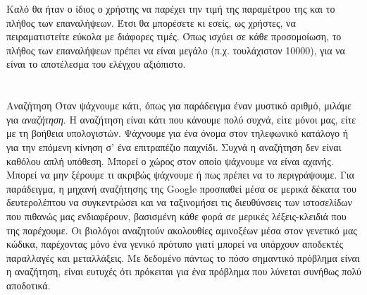 \documentclass[a4paper,11pt,oneside]{book}
\begin{document}
\begin{exercise}
\begin{note} 
Καλό θα ήταν ο ίδιος ο χρήστης να παρέχει την τιμή της παραμέτρου  της  και το πλήθος των επαναλήψεων. 
Έτσι θα μπορέσετε κι εσείς, ως χρήστες, να πειραματιστείτε εύκολα με διάφορες τιμές. Όπως ισχύει σε κάθε προσομοίωση, το πλήθος των επαναλήψεων πρέπει να είναι μεγάλο (π.χ. τουλάχιστον 10000), για να είναι το αποτέλεσμα του ελέγχου αξιόπιστο. 
\end{note}
\end{exercise}



\section*{}
\hrulefill


\begin{theory}{Αναζήτηση}
Όταν ψάχνουμε κάτι, όπως για παράδειγμα έναν μυστικό αριθμό, μιλάμε για \emph{αναζήτηση}. Η αναζήτηση είναι κάτι που κάνουμε πολύ συχνά, είτε μόνοι μας, είτε με τη βοήθεια υπολογιστών. Ψάχνουμε για ένα όνομα στον τηλεφωνικό κατάλογο ή για την επόμενη κίνηση σ' ένα επιτραπέζιο παιχνίδι. Συχνά η αναζήτηση δεν είναι καθόλου απλή υπόθεση. Μπορεί ο χώρος στον οποίο ψάχνουμε να είναι αχανής. Μπορεί να μην ξέρουμε τι ακριβώς ψάχνουμε ή πως πρέπει να το περιγράψουμε. Για παράδειγμα, η μηχανή αναζήτησης της Google προσπαθεί μέσα σε μερικά δέκατα του δευτερολέπτου να συγκεντρώσει και να ταξινομήσει τις διευθύνσεις των ιστοσελίδων που πιθανώς μας ενδιαφέρουν, βασισμένη κάθε φορά σε μερικές λέξεις-κλειδιά που της παρέχουμε. Οι βιολόγοι αναζητούν ακολουθίες αμινοξέων μέσα στον γενετικό μας κώδικα, παρέχοντας μόνο ένα γενικό πρότυπο γιατί μπορεί να υπάρχουν αποδεκτές παραλλαγές και μεταλλάξεις. Με δεδομένο πάντως το πόσο σημαντικό πρόβλημα είναι η αναζήτηση, είναι ευτυχές ότι πρόκειται για ένα πρόβλημα που λύνεται συνήθως πολύ αποδοτικά.
\end{theory}
\end{document}
